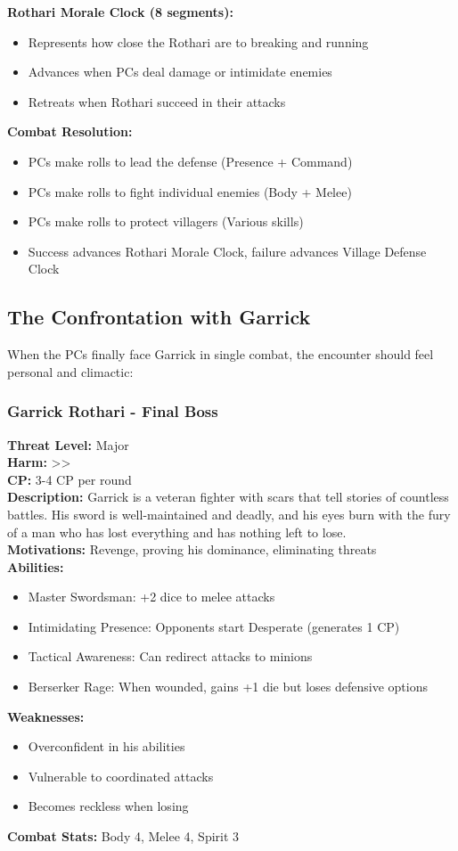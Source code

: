 \documentclass[11pt]{article}
\newenvironment{encounterbox}[1]{%
  \begin{mdframed}[backgroundcolor=encountercolor!30, linewidth=1pt, linecolor=accentcolor]%
  \subsubsection*{#1}%
}{%
  \end{mdframed}%
}
\begin{document}
\textbf{Rothari Morale Clock (8 segments):}
\begin{itemize}
\item Represents how close the Rothari are to breaking and running
\item Advances when PCs deal damage or intimidate enemies
\item Retreats when Rothari succeed in their attacks
\end{itemize}

\textbf{Combat Resolution:}
\begin{itemize}
\item PCs make rolls to lead the defense (Presence + Command)
\item PCs make rolls to fight individual enemies (Body + Melee)
\item PCs make rolls to protect villagers (Various skills)
\item Success advances Rothari Morale Clock, failure advances Village Defense Clock
\end{itemize}

\subsection{The Confrontation with Garrick}

When the PCs finally face Garrick in single combat, the encounter should feel personal and climactic:

\begin{encounterbox}{Garrick Rothari - Final Boss}
\textbf{Threat Level:} Major \\
\textbf{Harm:} \textgreater\textgreater \\
\textbf{CP:} 3-4 CP per round \\
\textbf{Description:} Garrick is a veteran fighter with scars that tell stories of countless battles. His sword is well-maintained and deadly, and his eyes burn with the fury of a man who has lost everything and has nothing left to lose. \\
\textbf{Motivations:} Revenge, proving his dominance, eliminating threats \\
\textbf{Abilities:}
\begin{itemize}
    \item Master Swordsman: +2 dice to melee attacks
    \item Intimidating Presence: Opponents start Desperate (generates 1 CP)
    \item Tactical Awareness: Can redirect attacks to minions
    \item Berserker Rage: When wounded, gains +1 die but loses defensive options
\end{itemize}
\textbf{Weaknesses:}
\begin{itemize}
    \item Overconfident in his abilities
    \item Vulnerable to coordinated attacks
    \item Becomes reckless when losing
\end{itemize}
\textbf{Combat Stats:} Body 4, Melee 4, Spirit 3
\end{encounterbox}
\end{document}
